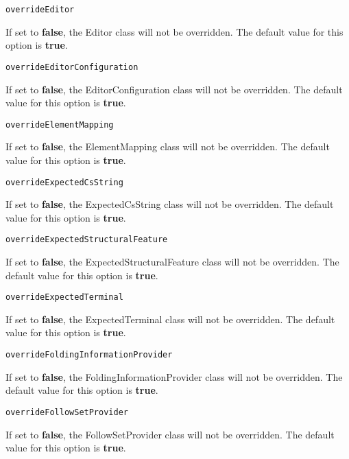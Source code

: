\noindent\texttt{overrideEditor}
\begin{myindentpar}{1cm}
If set to \textbf{false}, the Editor class will not be overridden. The default value for this option is \textbf{true}.
\end{myindentpar}

\noindent\texttt{overrideEditorConfiguration}
\begin{myindentpar}{1cm}
If set to \textbf{false}, the EditorConfiguration class will not be overridden. The default value for this option is \textbf{true}.
\end{myindentpar}

\noindent\texttt{overrideElementMapping}
\begin{myindentpar}{1cm}
If set to \textbf{false}, the ElementMapping class will not be overridden. The default value for this option is \textbf{true}.
\end{myindentpar}

\noindent\texttt{overrideExpectedCsString}
\begin{myindentpar}{1cm}
If set to \textbf{false}, the ExpectedCsString class will not be overridden. The default value for this option is \textbf{true}.
\end{myindentpar}

\noindent\texttt{overrideExpectedStructuralFeature}
\begin{myindentpar}{1cm}
If set to \textbf{false}, the ExpectedStructuralFeature class will not be overridden. The default value for this option is \textbf{true}.
\end{myindentpar}

\noindent\texttt{overrideExpectedTerminal}
\begin{myindentpar}{1cm}
If set to \textbf{false}, the ExpectedTerminal class will not be overridden. The default value for this option is \textbf{true}.
\end{myindentpar}

\noindent\texttt{overrideFoldingInformationProvider}
\begin{myindentpar}{1cm}
If set to \textbf{false}, the FoldingInformationProvider class will not be overridden. The default value for this option is \textbf{true}.
\end{myindentpar}

\noindent\texttt{overrideFollowSetProvider}
\begin{myindentpar}{1cm}
If set to \textbf{false}, the FollowSetProvider class will not be overridden. The default value for this option is \textbf{true}.
\end{myindentpar}

